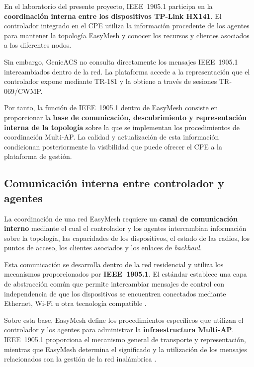 En el laboratorio del presente proyecto, IEEE~1905.1 participa en la
\textbf{coordinación interna entre los dispositivos TP-Link HX141}. El
controlador integrado en el CPE utiliza la información procedente de los
agentes para mantener la topología EasyMesh y conocer los recursos y
clientes asociados a los diferentes nodos.

Sin embargo, GenieACS no consulta directamente los mensajes
IEEE~1905.1 intercambiados dentro de la red. La plataforma accede a la
representación que el controlador expone mediante TR-181 y la obtiene a
través de sesiones TR-069/CWMP.

Por tanto, la función de IEEE~1905.1 dentro de EasyMesh consiste en
proporcionar la \textbf{base de comunicación, descubrimiento y
representación interna de la topología} sobre la que se implementan los
procedimientos de coordinación Multi-AP. La calidad y actualización de
esta información condicionan posteriormente la visibilidad que puede
ofrecer el CPE a la plataforma de gestión.

\subsection{Comunicación interna entre controlador y agentes}
\label{subsec:comunicacion-interna-controlador-agentes}

La coordinación de una red EasyMesh requiere un
\textbf{canal de comunicación interno} mediante el cual el controlador y
los agentes intercambian información sobre la topología, las capacidades
de los dispositivos, el estado de las radios, los puntos de acceso, los
clientes asociados y los enlaces de \textit{backhaul}.

Esta comunicación se desarrolla dentro de la red residencial y utiliza
los mecanismos proporcionados por \textbf{IEEE~1905.1}. El estándar
establece una capa de abstracción común que permite intercambiar mensajes
de control con independencia de que los dispositivos se encuentren
conectados mediante Ethernet, Wi-Fi u otra tecnología compatible
\cite{ieee_1905_1}.

Sobre esta base, EasyMesh define los procedimientos específicos que
utilizan el controlador y los agentes para administrar la
\textbf{infraestructura Multi-AP}. IEEE~1905.1 proporciona el mecanismo
general de transporte y representación, mientras que EasyMesh determina
el significado y la utilización de los mensajes relacionados con la
gestión de la red inalámbrica
\cite{wifi_alliance_easymesh,ieee_1905_1}.

